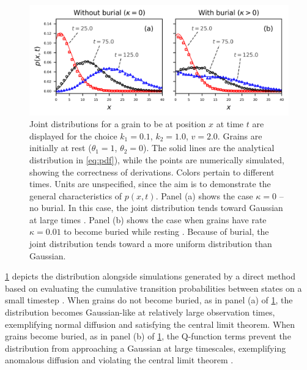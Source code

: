 \begin{figure}[!htbp]
	\includegraphics[width=\linewidth,keepaspectratio]{./figures/ch4/pdf-plot.png}
	\caption{Joint distributions for a grain to be at position $x$ at time $t$ are displayed for the choice $k_1=0.1$, $k_2=1.0$, $v=2.0$. Grains are \DIFdelbeginFL {}\DIFdelendFL initially at rest ($\theta_1=1$, $\theta_2=0$). The solid lines are the analytical distribution in \DIFdelbeginFL {}\DIFdelendFL \DIFaddbeginFL {}\DIFaddendFL \ref{eq:pdf}), while the points are numerically simulated, showing the correctness of \DIFdelbeginFL {}\DIFdelendFL \DIFaddbeginFL {}\DIFaddendFL derivations. Colors pertain to different times. Units are unspecified, since the aim is to demonstrate the general characteristics of $p(x,t)$. Panel (a) shows the case $\kappa=0$ -- no burial. In this case, the joint distribution tends toward Gaussian at large times \citep{Einstein1937,Lisle1998}. Panel (b) shows the case when grains have rate $\kappa = 0.01$ to become buried while resting \DIFaddbeginFL {}\DIFaddendFL . Because of burial, the joint distribution tends toward a more uniform distribution than Gaussian.
		\label{fig:diffpdfs}}
\end{figure}

\DIFdelbegin {}\DIFdelend \DIFaddbegin {}\DIFaddend \ref{fig:diffpdfs} depicts the distribution \DIFdelbegin \DIFdel{(\ref{eq:pdf} ) }\DIFdelend \DIFaddbegin {}\DIFaddend alongside simulations generated by a direct method based on evaluating the cumulative transition probabilities between states on a small timestep \citep{Barik2006}.
When grains do not become buried, as in panel (a) of \DIFdelbegin {}\DIFdelend \DIFaddbegin {}\DIFaddend \ref{fig:diffpdfs}, the distribution becomes Gaussian-like at relatively large observation times, exemplifying normal diffusion and satisfying the central limit theorem.
When grains become buried, as in panel (b) of \DIFdelbegin {}\DIFdelend \DIFaddbegin {}\DIFaddend \ref{fig:diffpdfs},  the Q-function terms prevent the distribution from approaching a Gaussian at large timescales, exemplifying anomalous diffusion \citep{Weeks1998} and violating the central limit theorem \citep{Metzler2000,Schumer2009}.


